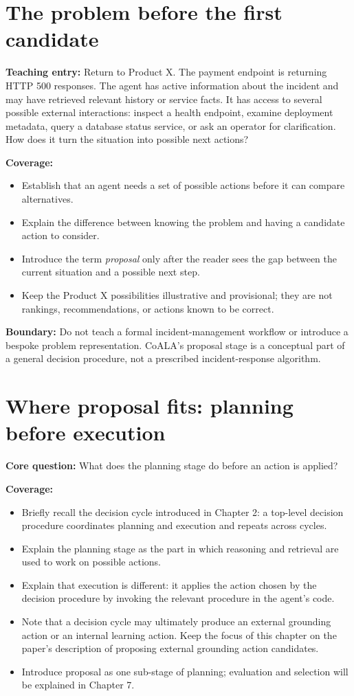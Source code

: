 \section{The problem before the first candidate}
\textbf{Teaching entry:} Return to Product X. The payment endpoint is returning HTTP 500 responses. The agent has active information about the incident and may have retrieved relevant history or service facts. It has access to several possible external interactions: inspect a health endpoint, examine deployment metadata, query a database status service, or ask an operator for clarification. How does it turn the situation into possible next actions?

\textbf{Coverage:}
\begin{itemize}
  \item Establish that an agent needs a set of possible actions before it can compare alternatives.
  \item Explain the difference between knowing the problem and having a candidate action to consider.
  \item Introduce the term \emph{proposal} only after the reader sees the gap between the current situation and a possible next step.
  \item Keep the Product X possibilities illustrative and provisional; they are not rankings, recommendations, or actions known to be correct.
\end{itemize}

\textbf{Boundary:} Do not teach a formal incident-management workflow or introduce a bespoke problem representation. CoALA's proposal stage is a conceptual part of a general decision procedure, not a prescribed incident-response algorithm.

\section{Where proposal fits: planning before execution}
\textbf{Core question:} What does the planning stage do before an action is applied?

\textbf{Coverage:}
\begin{itemize}
  \item Briefly recall the decision cycle introduced in Chapter 2: a top-level decision procedure coordinates planning and execution and repeats across cycles.
  \item Explain the planning stage as the part in which reasoning and retrieval are used to work on possible actions.
  \item Explain that execution is different: it applies the action chosen by the decision procedure by invoking the relevant procedure in the agent's code.
  \item Note that a decision cycle may ultimately produce an external grounding action or an internal learning action. Keep the focus of this chapter on the paper's description of proposing external grounding action candidates.
  \item Introduce proposal as one sub-stage of planning; evaluation and selection will be explained in Chapter 7.
\end{itemize}

